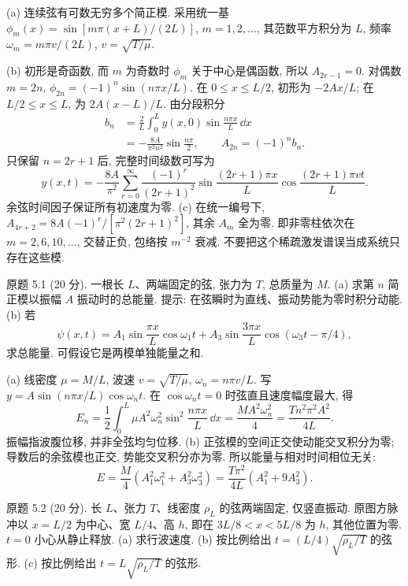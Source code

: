 \begin{solution}
(a) 连续弦有可数无穷多个简正模. 采用统一基 $\phi_m(x)=\sin[m\pi(x+L)/(2L)]$, $m=1,2,\ldots$, 其范数平方积分为 $L$, 频率 $\omega_m=m\pi v/(2L)$, $v=\sqrt{T/\mu}$.

(b) 初形是奇函数, 而 $m$ 为奇数时 $\phi_m$ 关于中心是偶函数, 所以 $A_{2r-1}=0$. 对偶数 $m=2n$, $\phi_{2n}=(-1)^n\sin(n\pi x/L)$. 在 $0\le x\le L/2$, 初形为 $-2Ax/L$; 在 $L/2\le x\le L$, 为 $2A(x-L)/L$. 由分段积分
\begin{align*}
b_n&=\frac2L\int_0^L y(x,0)\sin\frac{n\pi x}{L}\,\dd x\\
&=-\frac{8A}{\pi^2n^2}\sin\frac{n\pi}{2},\qquad A_{2n}=(-1)^nb_n.
\end{align*}
只保留 $n=2r+1$ 后, 完整时间级数可写为
\[
y(x,t)=-\frac{8A}{\pi^2}\sum_{r=0}^\infty\frac{(-1)^r}{(2r+1)^2}\sin\frac{(2r+1)\pi x}{L}\cos\frac{(2r+1)\pi vt}{L}.
\]
余弦时间因子保证所有初速度为零. (c) 在统一编号下, $A_{4r+2}=8A(-1)^r/[\pi^2(2r+1)^2]$, 其余 $A_m$ 全为零. 即非零柱依次在 $m=2,6,10,\ldots$, 交替正负, 包络按 $m^{-2}$ 衰减. 不要把这个稀疏激发谱误当成系统只存在这些模.
\end{solution}
\begin{exercise}\label{ps:5.1}
原题 5.1 (20 分). 一根长 $L$、两端固定的弦, 张力为 $T$, 总质量为 $M$. (a) 求第 $n$ 简正模以振幅 $A$ 振动时的总能量. 提示: 在弦瞬时为直线、振动势能为零时积分动能. (b) 若
\[
\psi(x,t)=A_1\sin\frac{\pi x}{L}\cos\omega_1t+A_3\sin\frac{3\pi x}{L}\cos(\omega_3t-\pi/4),
\]
求总能量. 可假设它是两模单独能量之和.
\end{exercise}
\begin{solution}
(a) 线密度 $\mu=M/L$, 波速 $v=\sqrt{T/\mu}$, $\omega_n=n\pi v/L$. 写 $y=A\sin(n\pi x/L)\cos\omega_nt$. 在 $\cos\omega_nt=0$ 时弦直且速度幅度最大, 得
\[
E_n=\frac12\int_0^L\mu A^2\omega_n^2\sin^2\frac{n\pi x}{L}\,\dd x=\frac{MA^2\omega_n^2}{4}=\frac{Tn^2\pi^2A^2}{4L}.
\]
振幅指波腹位移, 并非全弦均匀位移. (b) 正弦模的空间正交使动能交叉积分为零; 导数后的余弦模也正交, 势能交叉积分亦为零. 所以能量与相对时间相位无关:
\[
E=\frac M4(A_1^2\omega_1^2+A_3^2\omega_3^2)=\frac{T\pi^2}{4L}(A_1^2+9A_3^2).
\]
\end{solution}
\begin{exercise}\label{ps:5.2}
原题 5.2 (20 分). 长 $L$、张力 $T$、线密度 $\rho_L$ 的弦两端固定, 仅竖直振动. 原图方脉冲以 $x=L/2$ 为中心、宽 $L/4$、高 $h$, 即在 $3L/8<x<5L/8$ 为 $h$, 其他位置为零. $t=0$ 小心从静止释放. (a) 求行波速度. (b) 按比例给出 $t=(L/4)\sqrt{\rho_L/T}$ 的弦形. (c) 按比例给出 $t=L\sqrt{\rho_L/T}$ 的弦形.
\end{exercise}
